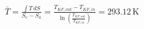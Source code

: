 \( \bar{T} = \frac{\int T \, dS}{S_e - S_a} = \frac{T_{KF,out} - T_{KF,in}}{\ln \left( \frac{T_{KF,out}}{T_{KF,in}} \right)} = 293.12 \, \text{K} \)